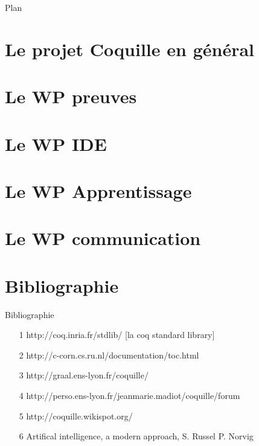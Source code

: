 \documentclass[slidetop]{beamer}
\begin{document}
\begin{frame}[plain]{Plan}
	\tableofcontents[hideallsubsections]
\end{frame}

\section{Le projet Coquille en g\'en\'eral}


\section{Le WP preuves}


\section{Le WP IDE}


\section{Le WP Apprentissage}


\section{Le WP communication}


\section{Bibliographie}

\begin{frame}{Bibliographie} 
 \begin{itemize}
\item [1] http://coq.inria.fr/stdlib/ [la coq standard library]
\item [2] http://c-corn.cs.ru.nl/documentation/toc.html%
\item [3] http://graal.ens-lyon.fr/coquille/
\item [4] http://perso.ens-lyon.fr/jeanmarie.madiot/coquille/forum %
\item [5] http://coquille.wikispot.org/ %
\item [6] Artifical intelligence, a modern approach, S. Russel P. Norvig
\end{itemize}
\end{frame}
\end{document}

